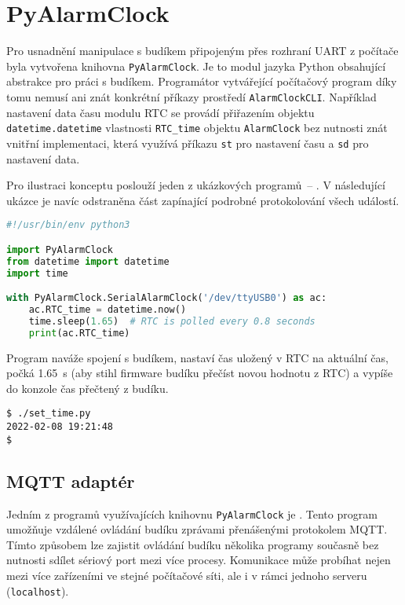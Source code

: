 \section{PyAlarmClock}
Pro usnadnění manipulace s budíkem připojeným přes rozhraní UART z počítače
byla vytvořena knihovna \texttt{PyAlarmClock}. Je to modul jazyka Python
obsahující abstrakce pro práci s budíkem. Programátor vytvářející počítačový
program díky tomu nemusí ani znát konkrétní příkazy prostředí
\texttt{AlarmClockCLI}. Například nastavení data času modulu RTC se provádí
přiřazením objektu \texttt{datetime.datetime} vlastnosti \verb|RTC_time|
objektu \texttt{AlarmClock} bez nutnosti znát vnitřní implementaci, která
využívá příkazu \texttt{st} pro nastavení času a \texttt{sd} pro nastavení
data.

Pro ilustraci konceptu poslouží jeden z ukázkových programů~--
. V následující ukázce je navíc odstraněna část
zapínající podrobné protokolování všech událostí.
\begin{lstlisting}[language=Python,style=numbers]
#!/usr/bin/env python3

import PyAlarmClock
from datetime import datetime
import time

with PyAlarmClock.SerialAlarmClock('/dev/ttyUSB0') as ac:
    ac.RTC_time = datetime.now()
    time.sleep(1.65)  # RTC is polled every 0.8 seconds
    print(ac.RTC_time)
\end{lstlisting}
Program naváže spojení s budíkem, nastaví čas uložený v RTC na aktuální čas,
počká \SI{1,65}{\second} (aby stihl firmware budíku přečíst novou hodnotu
z RTC) a vypíše do konzole čas přečtený z budíku.
\begin{lstlisting}[style=terminal]
$ ./set_time.py
2022-02-08 19:21:48
$
\end{lstlisting}


\subsection{MQTT adaptér}
Jedním z programů využívajících knihovnu \texttt{PyAlarmClock} je
. Tento program umožňuje vzdálené ovládání
budíku zprávami přenášenými protokolem MQTT. Tímto způsobem lze zajistit
ovládání budíku několika programy současně bez nutnosti sdílet sériový port
mezi více procesy. Komunikace může probíhat nejen mezi více zařízeními ve
stejné počítačové síti, ale i v rámci jednoho serveru (\texttt{localhost}).

